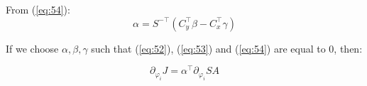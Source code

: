 \noindent From (\ref{eq:54}): 
\begin{equation} \label{eq:58} 
\alpha =  S^{-\top} \left( C_y^{\top} \beta - C_x^{\top} \gamma \right)
\end{equation}

\noindent If we choose $\alpha, \beta, \gamma$ such that  (\ref{eq:52}), (\ref{eq:53}) and (\ref{eq:54}) are equal to $0$, then: 

\begin{equation} \label{eq:59} 
\partial_{\varphi_i} J = \alpha^{\top} \partial_{\varphi_i} S A 
\end{equation}

